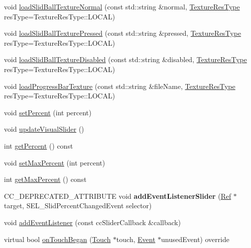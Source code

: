 \begin{DoxyCompactItemize}
\item 
void \hyperlink{classui_1_1Slider_afa65628c541d567403116f5c8dd0f2e4}{load\+Slid\+Ball\+Texture\+Normal} (const std\+::string \&normal, \hyperlink{classui_1_1Widget_a040a65ec5ad3b11119b7e16b98bd9af0}{Texture\+Res\+Type} res\+Type=Texture\+Res\+Type\+::\+L\+O\+C\+AL)
\item 
void \hyperlink{classui_1_1Slider_a86cb93cd2b0c422864fcdad7a5484825}{load\+Slid\+Ball\+Texture\+Pressed} (const std\+::string \&pressed, \hyperlink{classui_1_1Widget_a040a65ec5ad3b11119b7e16b98bd9af0}{Texture\+Res\+Type} res\+Type=Texture\+Res\+Type\+::\+L\+O\+C\+AL)
\item 
void \hyperlink{classui_1_1Slider_a6d4531a15ed308e060d681ef99d97ce0}{load\+Slid\+Ball\+Texture\+Disabled} (const std\+::string \&disabled, \hyperlink{classui_1_1Widget_a040a65ec5ad3b11119b7e16b98bd9af0}{Texture\+Res\+Type} res\+Type=Texture\+Res\+Type\+::\+L\+O\+C\+AL)
\item 
void \hyperlink{classui_1_1Slider_a7d4ee10a1661d3ca873288b92600dc54}{load\+Progress\+Bar\+Texture} (const std\+::string \&file\+Name, \hyperlink{classui_1_1Widget_a040a65ec5ad3b11119b7e16b98bd9af0}{Texture\+Res\+Type} res\+Type=Texture\+Res\+Type\+::\+L\+O\+C\+AL)
\item 
void \hyperlink{classui_1_1Slider_a720aa3007f2716699790494cd6731c6c}{set\+Percent} (int percent)
\item 
void \hyperlink{classui_1_1Slider_ace01b8797b23ae588f6f461da5cc667a}{update\+Visual\+Slider} ()
\item 
int \hyperlink{classui_1_1Slider_ad9612cb3d778733a4d5456ebe3892e44}{get\+Percent} () const
\item 
void \hyperlink{classui_1_1Slider_a08507a91d537eeb3b30596512ab3ac6e}{set\+Max\+Percent} (int percent)
\item 
int \hyperlink{classui_1_1Slider_a9938f947d4e314d3447f7d2375cad373}{get\+Max\+Percent} () const
\item 
\mbox{\label{classui_1_1Slider_af05cceaac9f1820c4bce13d76556efb8}} 
C\+C\+\_\+\+D\+E\+P\+R\+E\+C\+A\+T\+E\+D\+\_\+\+A\+T\+T\+R\+I\+B\+U\+TE void {\bfseries add\+Event\+Listener\+Slider} (\hyperlink{classRef}{Ref} $\ast$target, S\+E\+L\+\_\+\+Slid\+Percent\+Changed\+Event selector)
\item 
void \hyperlink{classui_1_1Slider_af03961eee2f27eb9f96a090fb860220f}{add\+Event\+Listener} (const cc\+Slider\+Callback \&callback)
\item 
virtual bool \hyperlink{classui_1_1Slider_a87345df854374dff2d59a401349e8de8}{on\+Touch\+Began} (\hyperlink{classTouch}{Touch} $\ast$touch, \hyperlink{classEvent}{Event} $\ast$unused\+Event) override

\end{DoxyCompactItemize}

